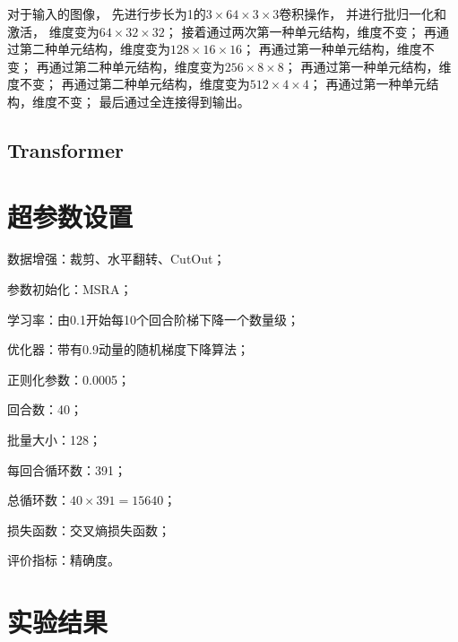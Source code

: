 \documentclass[12pt]{article}
\begin{document}
对于输入的图像，
先进行步长为1的$3\times64\times3\times3$卷积操作，
并进行批归一化和激活，
维度变为$64\times32\times32$；
接着通过两次第一种单元结构，维度不变；
再通过第二种单元结构，维度变为$128\times16\times16$；
再通过第一种单元结构，维度不变；
再通过第二种单元结构，维度变为$256\times8\times8$；
再通过第一种单元结构，维度不变；
再通过第二种单元结构，维度变为$512\times4\times4$；
再通过第一种单元结构，维度不变；
最后通过全连接得到输出。

\subsection{Transformer}

\section{超参数设置}

数据增强：裁剪、水平翻转、CutOut；

参数初始化：MSRA；

学习率：由0.1开始每10个回合阶梯下降一个数量级；

优化器：带有0.9动量的随机梯度下降算法；

正则化参数：0.0005；

回合数：40；

批量大小：128；

每回合循环数：391；

总循环数：$ 40 \times 391 = 15640$；

损失函数：交叉熵损失函数；

评价指标：精确度。

\section{实验结果}
	
\end{document}
